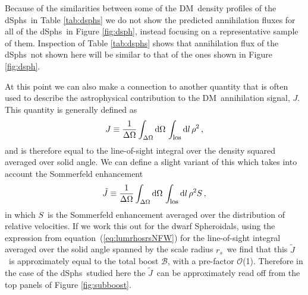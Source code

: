\documentclass[aps,prd,twocolumn,amsmath,amssymb,floatfix,nofootinbib,10pt]{revtex4}
\newcommand{\DM}{DM}
\newcommand{\somm}{\ensuremath{S}}
\newcommand{\dd}{\mathrm{d}}
\newcommand{\eqnname}{equation}
\newcommand{\order}{\ensuremath{\mathcal{O}}}
\newcommand{\totalboost}{\ensuremath{\mathcal{B}}}
\newcommand{\rs}{\ensuremath{r_s}}
\newcommand{\dSphs}{dSphs}
\newcommand{\Jtilde}{\ensuremath{\tilde{J}}}
\begin{document}
Because of the similarities between some of the \DM\ density profiles
of the \dSphs\ in Table \ref{tab:dsphs} we do not show the predicted
annihilation fluxes for all of the \dSphs\ in Figure \ref{fig:dsph},
instead focusing on a representative sample of them. Inspection of
Table \ref{tab:dsphs} shows that annihilation flux of the \dSphs\ not
shown here will be similar to that of the ones shown in Figure
\ref{fig:dsph}.


At this point we can also make a connection to another quantity that
is often used to describe the astrophysical contribution to the \DM\
annihilation signal, $J$. This quantity is generally defined as
\begin{equation}
J \equiv \frac{1}{\Delta \Omega} \int_{\Delta \Omega} \dd \Omega\, \int_{\mbox{{\footnotesize los}}} \dd l\, \rho^2\, ,
\end{equation}
and is therefore equal to the line-of-sight integral over the density
squared averaged over solid angle. We can define a slight variant of
this which takes into account the Sommerfeld enhancement
\begin{equation}
\Jtilde \equiv \frac{1}{\Delta \Omega} \int_{\Delta \Omega} \dd \Omega\, \int_{\mbox{{\footnotesize los}}} \dd l\, \rho^2 \somm\, ,
\end{equation}
in which \somm\ is the Sommerfeld enhancement averaged over the
distribution of relative velocities. If we work this out for the
dwarf Spheroidals, using the expression from \eqnname\
(\ref{eq:lumrhosrsNFW}) for the line-of-sight integral averaged over
the solid angle spanned by the scale radius \rs\ we find that this
\Jtilde\ is approximately equal to the total boost \totalboost, with a
pre-factor \order(1). Therefore in the case of the \dSphs\ studied
here the \Jtilde\ can be approximately read off from the top panels of
Figure \ref{fig:subboost}.
\end{document}
